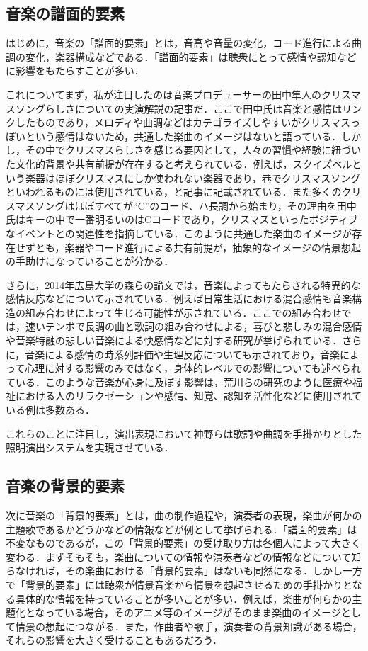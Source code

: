 \subsection{音楽の譜面的要素}
はじめに，音楽の「譜面的要素」とは，音高や音量の変化，コード進行による曲調の変化，楽器構成などである．「譜面的要素」は聴衆にとって感情や認知などに影響をもたらすことが多い．

これについてまず，私が注目したのは音楽プロデューサーの田中隼人のクリスマスソングらしさについての実演解説の記事だ\cite{xmassong}．ここで田中氏は音楽と感情はリンクしたものであり，メロディや曲調などはカテゴライズしやすいがクリスマスっぽいという感情はないため，共通した楽曲のイメージはないと語っている．しかし，その中でクリスマスらしさを感じる要因として，人々の習慣や経験に紐づいた文化的背景や共有前提が存在すると考えられている．例えば，スクイズベルという楽器はほぼクリスマスにしか使われない楽器であり，巷でクリスマスソングといわれるものには使用されている，と記事に記載されている．また多くのクリスマスソングはほぼすべてが“C”のコード、ハ長調から始まり，その理由を田中氏はキーの中で一番明るいのはCコードであり，クリスマスといったポジティブなイベントとの関連性を指摘している．このように共通した楽曲のイメージが存在せずとも，楽器やコード進行による共有前提が，抽象的なイメージの情景想起の手助けになっていることが分かる．

さらに，2014年広島大学の森らの論文では，音楽によってもたらされる特異的な感情反応などについて示されている\cite{Mori14}．例えば日常生活における混合感情も音楽構造の組み合わせによって生じる可能性が示されている．ここでの組み合わせでは，速いテンポで長調の曲と歌詞の組み合わせによる，喜びと悲しみの混合感情や音楽特融の悲しい音楽による快感情などに対する研究が挙げられている．さらに，音楽による感情の時系列評価や生理反応についても示されており，音楽によって心理に対する影響のみではなく，身体的レベルでの影響についても述べられている．このような音楽が心身に及ぼす影響は，荒川らの研究のように医療や福祉における人のリラクゼーションや感情、知覚、認知を活性化などに使用されている例は多数ある\cite{Arakawa96}．

これらのことに注目し，演出表現において神野らは歌詞や曲調を手掛かりとした照明演出システムを実現させている\cite{Kanno22}．

\subsection{音楽の背景的要素}
次に音楽の「背景的要素」とは，曲の制作過程や，演奏者の表現，楽曲が何かの主題歌であるかどうかなどの情報などが例として挙げられる．「譜面的要素」は不変なものであるが，この「背景的要素」の受け取り方は各個人によって大きく変わる．まずそもそも，楽曲についての情報や演奏者などの情報などについて知らなければ，その楽曲における「背景的要素」はないも同然になる．しかし一方で「背景的要素」には聴衆が情景音楽から情景を想起させるための手掛かりとなる具体的な情報を持っていることが多いことが多い．例えば，楽曲が何らかの主題化となっている場合，そのアニメ等のイメージがそのまま楽曲のイメージとして情景の想起につながる．また，作曲者や歌手，演奏者の背景知識がある場合，それらの影響を大きく受けることもあるだろう．


